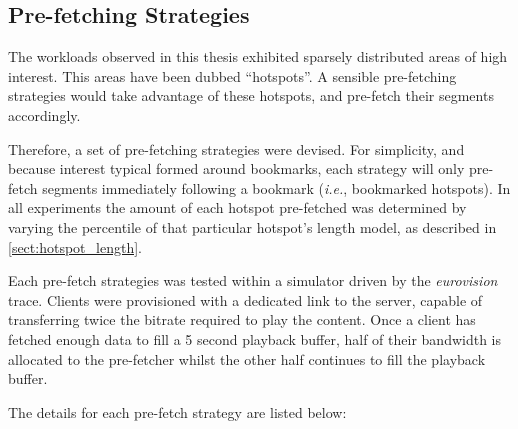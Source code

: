 \subsection{Pre-fetching Strategies}

The workloads observed in this thesis exhibited sparsely distributed areas of high interest. This areas have been dubbed ``hotspots''. A sensible pre-fetching strategies would take advantage of these hotspots, and pre-fetch their segments accordingly.

Therefore, a set of pre-fetching strategies were devised. For simplicity, and because interest typical formed around bookmarks, each strategy will only pre-fetch segments immediately following a bookmark (\emph{i.e.}, bookmarked hotspots). In all experiments the amount of each hotspot pre-fetched was determined by varying the percentile of that particular hotspot's length model, as described in \autoref{sect:hotspot_length}.

Each pre-fetch strategies was tested within a simulator driven by the \emph{eurovision} trace. Clients were provisioned with a dedicated link to the server, capable of transferring twice the bitrate required to play the content. Once a client has fetched enough data to fill a 5 second playback buffer, half of their bandwidth is allocated to the pre-fetcher whilst the other half continues to fill the playback buffer.

The details for each pre-fetch strategy are listed below:



